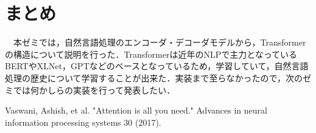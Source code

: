 \documentclass[a4j, 11pt]{jsarticle}
\numberwithin{equation}{section}
\begin{document}
\section{まとめ}
　本ゼミでは，自然言語処理のエンコーダ・デコーダモデルから，Transformerの構造について説明を行った．Transformerは近年のNLPで主力となっているBERTやXLNet，GPTなどのベースとなっているため，学習していて，自然言語処理の歴史について学習することが出来た．実装まで至らなかったので，次のゼミでは何かしらの実装を行って発表したい．
　


\begin{thebibliography}{99}
Vaswani, Ashish, et al. "Attention is all you need." Advances in neural information processing systems 30 (2017). 
\end{thebibliography}
\end{document}
